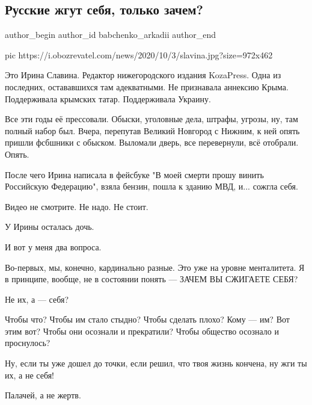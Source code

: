  
 
 
 
 
\subsection{Русские жгут себя, только зачем?}
\label{sec:03_10_2020.oboz.babchenko.1.irina_slavina_death}

\ifcmt
  author_begin
   author_id babchenko_arkadii
  author_end
\fi

\ifcmt
pic https://i.obozrevatel.com/news/2020/10/3/slavina.jpg?size=972x462
\fi

Это Ирина Славина. Редактор нижегородского издания KozaPress. Одна из
последних, остававшихся там адекватными. Не признавала аннексию Крыма.
Поддерживала крымских татар. Поддерживала Украину.

Все эти годы её прессовали. Обыски, уголовные дела, штрафы, угрозы, ну, там
полный набор был. Вчера, перепутав Великий Новгород с Нижним, к ней опять
пришли фсбшники с обыском. Выломали дверь, все перевернули, всё отобрали.
Опять.

После чего Ирина написала в фейсбуке "В моей смерти прошу винить Российскую
Федерацию", взяла бензин, пошла к зданию МВД, и... сожгла себя.

Видео не смотрите. Не надо. Не стоит.

У Ирины осталась дочь.

И вот у меня два вопроса.

Во-первых, мы, конечно, кардинально разные. Это уже на уровне менталитета. Я в
принципе, вообще, не в состоянии понять --- ЗАЧЕМ ВЫ СЖИГАЕТЕ СЕБЯ?

Не их, а --- себя?

Чтобы что? Чтобы им стало стыдно? Чтобы сделать плохо? Кому --- им? Вот этим вот?
Чтобы они осознали и прекратили? Чтобы общество осознало и проснулось?

Ну, если ты уже дошел до точки, если решил, что твоя жизнь кончена, ну жги ты
их, а не себя!

Палачей, а не жертв.

